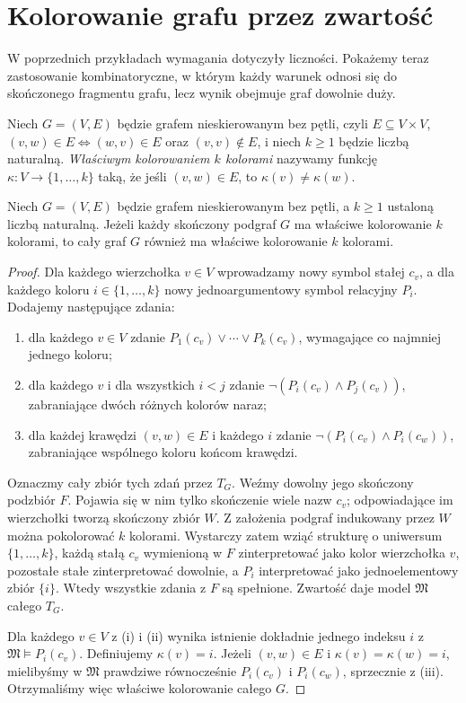\section{Kolorowanie grafu przez zwartość}\label{sec:compactness-coloring}
W poprzednich przykładach wymagania dotyczyły liczności. Pokażemy teraz zastosowanie kombinatoryczne, w którym każdy warunek odnosi się do skończonego fragmentu grafu, lecz wynik obejmuje graf dowolnie duży.

\begin{definicja}\label{def:compactness-coloring}
Niech $G=(V,E)$ będzie grafem nieskierowanym bez pętli, czyli $E\subseteq V\times V$, $(v,w)\in E\iff(w,v)\in E$ oraz $(v,v)\notin E$, i niech $k\ge1$ będzie liczbą naturalną. \emph{Właściwym kolorowaniem $k$ kolorami} nazywamy funkcję $\kappa:V\to\{1,\ldots,k\}$ taką, że jeśli $(v,w)\in E$, to $\kappa(v)\ne\kappa(w)$.
\end{definicja}

\begin{twierdzenie}\label{thm:compactness-graph-coloring}
Niech $G=(V,E)$ będzie grafem nieskierowanym bez pętli, a $k\ge1$ ustaloną liczbą naturalną. Jeżeli każdy skończony podgraf $G$ ma właściwe kolorowanie $k$ kolorami, to cały graf $G$ również ma właściwe kolorowanie $k$ kolorami.
\end{twierdzenie}
\begin{proof}
Dla każdego wierzchołka $v\in V$ wprowadzamy nowy symbol stałej $c_v$, a dla każdego koloru $i\in\{1,\ldots,k\}$ nowy jednoargumentowy symbol relacyjny $P_i$. Dodajemy następujące zdania:
\begin{enumerate}[label=(\roman*)]
\item dla każdego $v\in V$ zdanie $P_1(c_v)\lor\cdots\lor P_k(c_v)$, wymagające co najmniej jednego koloru;
\item dla każdego $v$ i dla wszystkich $i<j$ zdanie $\neg(P_i(c_v)\land P_j(c_v))$, zabraniające dwóch różnych kolorów naraz;
\item dla każdej krawędzi $(v,w)\in E$ i każdego $i$ zdanie $\neg(P_i(c_v)\land P_i(c_w))$, zabraniające wspólnego koloru końcom krawędzi.
\end{enumerate}
Oznaczmy cały zbiór tych zdań przez $T_G$. Weźmy dowolny jego skończony podzbiór $F$. Pojawia się w nim tylko skończenie wiele nazw $c_v$; odpowiadające im wierzchołki tworzą skończony zbiór $W$. Z założenia podgraf indukowany przez $W$ można pokolorować $k$ kolorami. Wystarczy zatem wziąć strukturę o uniwersum $\{1,\ldots,k\}$, każdą stałą $c_v$ wymienioną w $F$ zinterpretować jako kolor wierzchołka $v$, pozostałe stałe zinterpretować dowolnie, a $P_i$ interpretować jako jednoelementowy zbiór $\{i\}$. Wtedy wszystkie zdania z $F$ są spełnione. Zwartość daje model $\mathfrak M$ całego $T_G$.

Dla każdego $v\in V$ z (i) i (ii) wynika istnienie dokładnie jednego indeksu $i$ z $\mathfrak M\models P_i(c_v)$. Definiujemy $\kappa(v)=i$. Jeżeli $(v,w)\in E$ i $\kappa(v)=\kappa(w)=i$, mielibyśmy w $\mathfrak M$ prawdziwe równocześnie $P_i(c_v)$ i $P_i(c_w)$, sprzecznie z (iii). Otrzymaliśmy więc właściwe kolorowanie całego $G$.
\end{proof}

